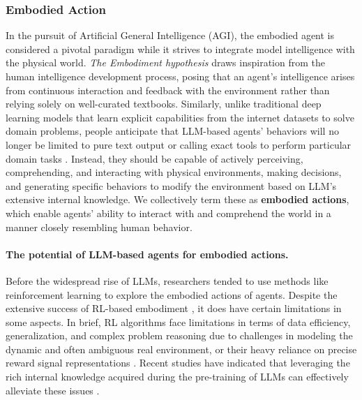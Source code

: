 \subsubsection{Embodied Action}\label{sec:Embodied Action}
In the pursuit of Artificial General Intelligence (AGI), the embodied agent is considered a pivotal paradigm while it strives to integrate model intelligence with the physical world. \textit{The Embodiment hypothesis} \cite{smith2005development} draws inspiration from the human intelligence development process, posing that an agent's intelligence arises from continuous interaction and feedback with the environment rather than relying solely on well-curated textbooks. Similarly, unlike traditional deep learning models that learn explicit capabilities from the internet datasets to solve domain problems, people anticipate that LLM-based agents' behaviors will no longer be limited to pure text output or calling exact tools to perform particular domain tasks \cite{DBLP:journals/tetci/DuanYTZT22}. 
Instead, they should be capable of actively perceiving, comprehending, and interacting with physical environments, making decisions, and generating specific behaviors to modify the environment based on LLM's extensive internal knowledge. We collectively term these as \textbf{embodied actions}, which enable agents' ability to interact with and comprehend the world in a manner closely resembling human behavior.

\paragraph{The potential of LLM-based agents for embodied actions.}
Before the widespread rise of LLMs, researchers tended to use methods like reinforcement learning to explore the embodied actions of agents. Despite the extensive success of RL-based embodiment \cite{DBLP:journals/corr/MnihKSGAWR13, DBLP:journals/nature/SilverHMGSDSAPL16, DBLP:journals/corr/abs-1806-10293}, it does have certain limitations in some aspects. In brief, RL algorithms face limitations in terms of data efficiency, generalization, and complex problem reasoning due to challenges in modeling the dynamic and often ambiguous real environment, or their heavy reliance on precise reward signal representations \cite{DBLP:conf/irc/NguyenL19}. 
Recent studies have indicated that leveraging the rich internal knowledge acquired during the pre-training of LLMs can effectively alleviate these issues \cite{DBLP:conf/icml/DriessXSLCIWTVY23, DBLP:conf/corl/HuangXXCLFZTMCS22, DBLP:conf/icml/HuangAPM22, DBLP:journals/corr/abs-2302-00763}. 

